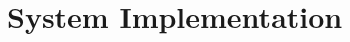 \section{System Implementation}

\subsection{}

\subsection{}

\subsection{}

\subsection{}

\clearpage
